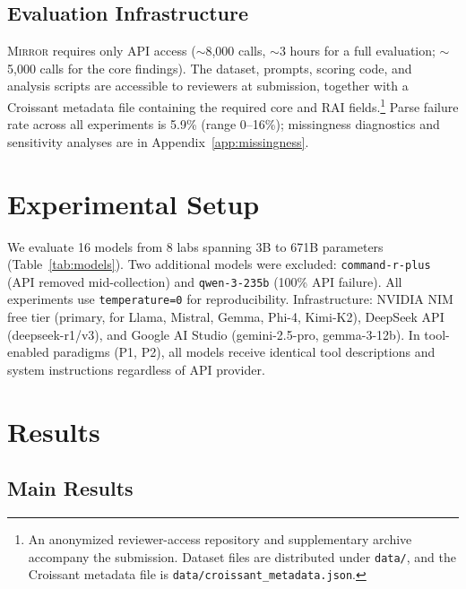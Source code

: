\documentclass[10pt]{article}
\newcommand{\mirror}{\textsc{Mirror}}
\begin{document}
\subsection{Evaluation Infrastructure}

\mirror{} requires only API access ($\sim$8,000 calls, $\sim$3 hours for a full evaluation; $\sim$5,000 calls for the core findings). The dataset, prompts, scoring code, and analysis scripts are accessible to reviewers at submission, together with a Croissant metadata file containing the required core and RAI fields.\footnote{An anonymized reviewer-access repository and supplementary archive accompany the submission. Dataset files are distributed under \texttt{data/}, and the Croissant metadata file is \texttt{data/croissant\_metadata.json}.} Parse failure rate across all experiments is 5.9\% (range 0--16\%); missingness diagnostics and sensitivity analyses are in Appendix~\ref{app:missingness}.

\section{Experimental Setup}
\label{sec:setup}



We evaluate 16 models from 8 labs spanning 3B to 671B parameters
(Table~\ref{tab:models}). Two additional models were excluded: \texttt{command-r-plus} (API removed mid-collection) and \texttt{qwen-3-235b} (100\% API failure). All experiments use \texttt{temperature=0} for reproducibility. Infrastructure: NVIDIA NIM free tier (primary, for Llama, Mistral, Gemma, Phi-4, Kimi-K2), DeepSeek API (deepseek-r1/v3), and Google AI Studio (gemini-2.5-pro, gemma-3-12b). In tool-enabled paradigms (P1, P2), all models receive identical tool descriptions and system instructions regardless of API provider.

\section{Results}
\label{sec:results}

\subsection{Main Results}
\end{document}
